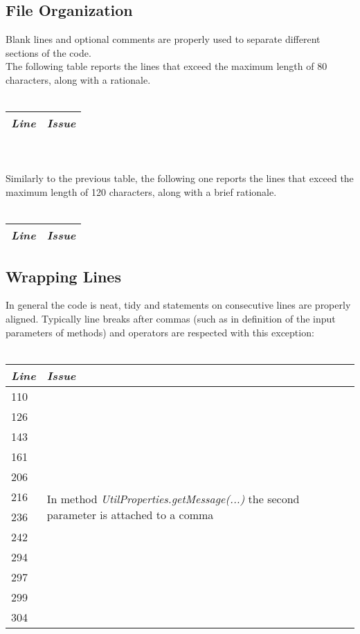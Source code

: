 \documentclass[11pt,a4paper]{report}
\begin{document}
\subsection{File Organization}
Blank lines and optional comments are properly used to separate different sections of the code.\\
The following table reports the lines that exceed the maximum length of 80 characters, along with a rationale.\\
\\
\begin{tabularx}{\textwidth}{|l|X|}
	\hline
	\textit{Line} & \textit{Issue}\\
	\hline
\end{tabularx}\\
\\
Similarly to the previous table, the following one reports the lines that exceed the maximum length of 120 characters, along with a brief rationale.\\
\\
\begin{tabularx}{\textwidth}{|l|X|}
	\hline
	\textit{Line} & \textit{Issue}\\
	\hline
\end{tabularx}
\subsection{Wrapping Lines}
In general the code is neat, tidy and statements on consecutive lines are properly aligned. Typically line breaks after commas (such as in definition of the input parameters of methods) and operators are respected with this exception:
\\\\
\begin{tabularx}{\textwidth}{|l|X|}
	\hline
	\textit{Line} & \textit{Issue}\\
	\hline
	110 & \multirow{12}{\linewidth}{In method \textit{UtilProperties.getMessage(...)} the second parameter is attached to a comma}\\
	126 & \\
	143 & \\
	161 & \\
	206 & \\
	216 & \\
	236 & \\
	242 & \\
	294 & \\
	297 & \\
	299 & \\
	304 & \\
	\hline
\end{tabularx}
\end{document}
